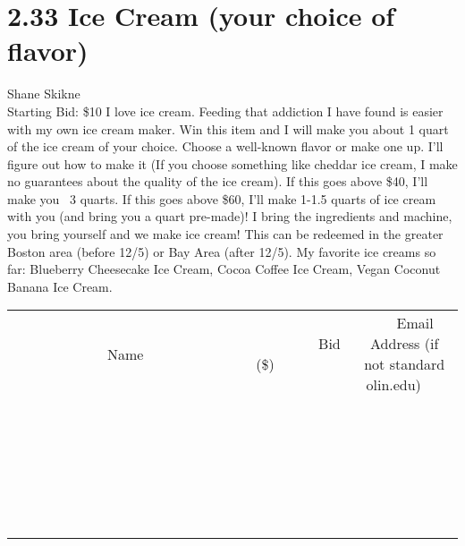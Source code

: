 \documentclass[11pt]{article}
\begin{document}
\section*{2.33 Ice Cream (your choice of flavor)}
Shane Skikne
\\
Starting Bid: \$10
\newline
I love ice cream. Feeding that addiction I have found is easier with my own ice cream maker. Win this item and I will make you about 1 quart of the ice cream of your choice. Choose a well-known flavor or make one up. I'll figure out how to make it (If you choose something like cheddar ice cream, I make no guarantees about the quality of the ice cream). If this goes above \$40, I'll make you ~3 quarts. If this goes above \$60, I'll make 1-1.5 quarts of ice cream with you (and bring you a quart pre-made)! I bring the ingredients and machine, you bring yourself and we make ice cream! This can be redeemed in the greater Boston area (before 12/5) or Bay Area (after 12/5). My favorite ice creams so far: Blueberry Cheesecake Ice Cream, Cocoa Coffee Ice Cream, Vegan Coconut Banana Ice Cream.
\\[6ex]
\begin{tabular}{c c c}
~~~~~~~~~~~~~Name~~~~~~~~~~~~~ & ~~~~~~~~~Bid (\$)~~~~~~~~~  & ~~~Email Address (if not standard olin.edu)~~~\\
 & & \\
\hline
 & & \\
\hline
 & & \\
\hline
 & & \\
\hline
 & & \\
\hline
 & & \\
\hline
 & & \\
\hline
 & & \\
\hline
 & & \\
\hline
 & & \\
\hline
 & & \\
\hline
 & & \\
\hline
 & & \\
\hline
 & & \\
\hline
 & & \\
\hline
 & & \\
\hline
 & & \\
\hline
 & & \\
\hline
 & & \\
\hline
 & & \\
\hline
 & & \\
\hline
 & & \\
\hline
 & & \\
\hline
 & & \\
\hline
 & & \\
\hline
 & & \\
\hline
\end{tabular}
\newpage
\end{document}

